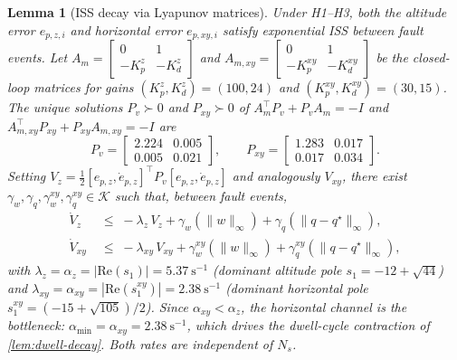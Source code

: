 \documentclass[lettersize,journal]{IEEEtran}
\newtheorem{lemma}{Lemma}%
\begin{document}
\begin{lemma}[ISS decay via Lyapunov matrices]
\label{lem:altitude-iss}
\label{lem:horizontal-iss}
Under H1--H3, both the altitude error $e_{p,z,i}$ and horizontal
error $e_{p,xy,i}$ satisfy exponential ISS between fault events.
Let $A_m\!=\!\begin{bmatrix}0&1\\-K_p^z&-K_d^z\end{bmatrix}$ and
$A_{m,xy}\!=\!\begin{bmatrix}0&1\\-K_p^{xy}&-K_d^{xy}\end{bmatrix}$
be the closed-loop matrices for gains $(K_p^z,K_d^z)\!=\!(100,24)$
and $(K_p^{xy},K_d^{xy})\!=\!(30,15)$.
The unique solutions $P_v \succ 0$ and $P_{xy} \succ 0$ of
$A_m^\top P_v + P_v A_m = -I$ and
$A_{m,xy}^\top P_{xy} + P_{xy} A_{m,xy} = -I$ are
\begin{equation}
  P_v = \begin{bmatrix} 2.224 & 0.005 \\ 0.005 & 0.021 \end{bmatrix},
  \qquad
  P_{xy} = \begin{bmatrix} 1.283 & 0.017 \\ 0.017 & 0.034 \end{bmatrix}.
  \label{eq:Pv-numeric}
\end{equation}
Setting $V_z = \tfrac{1}{2}[e_{p,z},\dot{e}_{p,z}]^\top P_v
[e_{p,z},\dot{e}_{p,z}]$ and analogously $V_{xy}$, there exist
$\gamma_w,\gamma_q,\gamma_w^{xy},\gamma_q^{xy} \in \mathcal{K}$
such that, between fault events,
\begin{align}
  \dot V_z &\;\le\; -\lambda_z\,V_z
    + \gamma_w(\|w\|_\infty) + \gamma_q(\|q - q^\star\|_\infty),
  \label{eq:lyapunov-decay-alt}\\
  \dot V_{xy} &\;\le\; -\lambda_{xy}\,V_{xy}
    + \gamma_w^{xy}(\|w\|_\infty) + \gamma_q^{xy}(\|q - q^\star\|_\infty),
  \label{eq:lyapunov-decay-xy}
\end{align}
with $\lambda_z = \alpha_z = |\mathrm{Re}(s_1)| =
\SI{5.37}{\second^{-1}}$ (dominant altitude pole
$s_1 = -12+\sqrt{44}$) and $\lambda_{xy} = \alpha_{xy} =
|\mathrm{Re}(s_1^{xy})| = \SI{2.38}{\second^{-1}}$ (dominant
horizontal pole $s_1^{xy} = (-15+\sqrt{105})/2$). Since
$\alpha_{xy} < \alpha_z$, the horizontal channel is the
bottleneck: $\alpha_{\min} = \alpha_{xy} =
\SI{2.38}{\second^{-1}}$, which drives the dwell-cycle
contraction of \cref{lem:dwell-decay}. Both rates are
independent of $N_s$.
\end{lemma}
\end{document}
